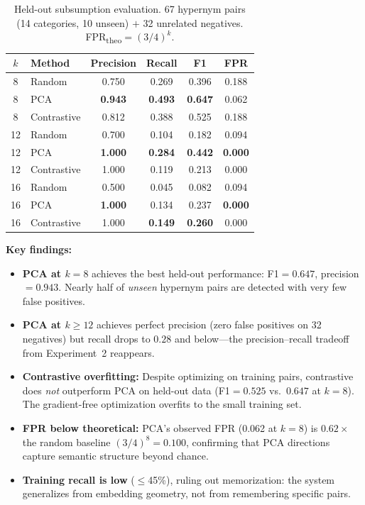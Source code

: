 \documentclass[10pt]{article}
\begin{document}
\begin{table}[ht]
\centering
\caption{Held-out subsumption evaluation. 67 hypernym pairs (14 categories, 10 unseen) $+$ 32 unrelated negatives. FPR\textsubscript{theo}$=(3/4)^k$.}
\label{tab:heldout}
\begin{tabular}{clcccc}
\toprule
$k$ & Method & Precision & Recall & F1 & FPR \\
\midrule
8  & Random      & 0.750 & 0.269 & 0.396 & 0.188 \\
8  & PCA         & \textbf{0.943} & \textbf{0.493} & \textbf{0.647} & 0.062 \\
8  & Contrastive & 0.812 & 0.388 & 0.525 & 0.188 \\
\midrule
12 & Random      & 0.700 & 0.104 & 0.182 & 0.094 \\
12 & PCA         & \textbf{1.000} & \textbf{0.284} & \textbf{0.442} & \textbf{0.000} \\
12 & Contrastive & 1.000 & 0.119 & 0.213 & 0.000 \\
\midrule
16 & Random      & 0.500 & 0.045 & 0.082 & 0.094 \\
16 & PCA         & \textbf{1.000} & 0.134 & 0.237 & \textbf{0.000} \\
16 & Contrastive & 1.000 & \textbf{0.149} & \textbf{0.260} & 0.000 \\
\bottomrule
\end{tabular}
\end{table}

\noindent\textbf{Key findings:}
\begin{itemize}[nosep, leftmargin=*]
    \item \textbf{PCA at $k\!=\!8$} achieves the best held-out performance: F1$=0.647$, precision$=0.943$. Nearly half of \emph{unseen} hypernym pairs are detected with very few false positives.
    \item \textbf{PCA at $k \geq 12$} achieves perfect precision (zero false positives on 32 negatives) but recall drops to $0.28$ and below---the precision--recall tradeoff from Experiment~2 reappears.
    \item \textbf{Contrastive overfitting:} Despite optimizing on training pairs, contrastive does \emph{not} outperform PCA on held-out data (F1$=0.525$ vs.\ $0.647$ at $k\!=\!8$). The gradient-free optimization overfits to the small training set.
    \item \textbf{FPR below theoretical:} PCA's observed FPR (0.062 at $k\!=\!8$) is $0.62\times$ the random baseline $(3/4)^8 = 0.100$, confirming that PCA directions capture semantic structure beyond chance.
    \item \textbf{Training recall is low} ($\leq$45\%), ruling out memorization: the system generalizes from embedding geometry, not from remembering specific pairs.
\end{itemize}
\end{document}
